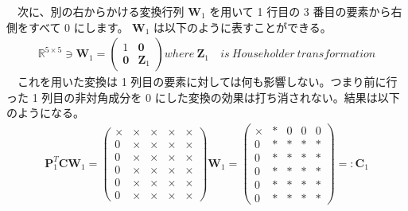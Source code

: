\documentclass[dvipdfmx,10pt,presentation]{beamer}
\begin{document}
\begin{frame}[label={sec:orgb797d6b}]{}
　次に、別の右からかける変換行列 \(\bm{W}_1\) を用いて 1 行目の 3 番目の要素から右側をすべて 0 にします。 \(\bm{W}_1\) は以下のように表すことができる。\\
\begin{align*}
\mathbb{R}^{5\times5} \ni \bm{W}_1 = 
\begin{pmatrix}
1 & \bm{0} \\
\bm{0} & \bm{Z}_1 
\end{pmatrix}
where\ \bm{Z}_1\ &is\ Householder\ transformation
\end{align*}
　これを用いた変換は 1 列目の要素に対しては何も影響しない。つまり前に行った 1 列目の非対角成分を 0 にした変換の効果は打ち消されない。結果は以下のようになる。\\
\begin{align*}
\bm{P}^T_1\bm{C}\bm{W}_1 =
\begin{pmatrix}
\times & \times & \times & \times & \times \\
0 & \times & \times & \times & \times \\
0 & \times & \times & \times & \times \\
0 & \times & \times & \times &  \times \\
0 & \times & \times & \times &  \times \\
0 & \times & \times & \times &  \times
\end{pmatrix}
\bm{W}_1
=
\begin{pmatrix}
\times & \ast & 0 & 0 & 0 \\
0 & \ast & \ast & \ast & \ast \\
0 & \ast & \ast & \ast & \ast \\
0 & \ast & \ast & \ast &  \ast \\
0 & \ast & \ast & \ast &  \ast \\
0 & \ast & \ast & \ast &  \ast
\end{pmatrix}
=: \bm{C}_1
\end{align*}
\end{frame}
\end{document}
